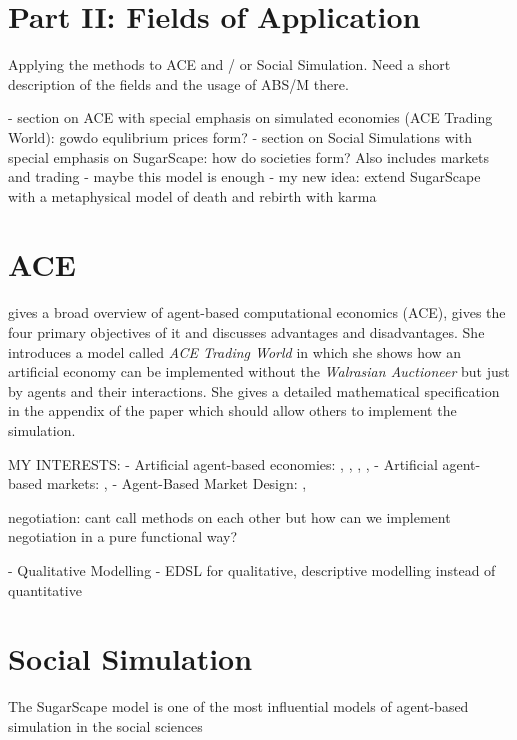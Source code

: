 \section{Part II: Fields of Application}
Applying the methods to ACE and / or Social Simulation. Need a short description of the fields and the usage of ABS/M there.

- section on ACE with special emphasis on simulated economies (ACE Trading World): gowdo equlibrium prices form?
- section on Social Simulations with special emphasis on SugarScape: how do societies form? Also includes markets and trading - maybe this model is enough
- my new idea: extend SugarScape with a metaphysical  model of death and rebirth with karma


\section{ACE}
\cite{tesfatsion_agent-based_2006} gives a broad overview of agent-based computational economics (ACE), gives the four primary objectives of it and discusses advantages and disadvantages. She introduces a model called \textit{ACE Trading World} in which she shows how an artificial economy can be implemented without the \textit{Walrasian Auctioneer} but just by agents and their interactions. She gives a detailed mathematical specification in the appendix of the paper which should allow others to implement the simulation.

MY INTERESTS:
- Artificial agent-based economies: \cite{tesfatsion_agent-based_2006}, \cite{gintis_emergence_2006}, \cite{gintis_dynamics_2007}, \cite{gaffeo_adaptive_2008}, \cite{botta_functional_2011}
- Artificial agent-based markets: \cite{mackie-mason_chapter_2006}, \cite{darley_nasdaq_2007}
- Agent-Based Market Design: \cite{marks_chapter_2006}, \cite{budish_editors_2015}

negotiation: cant call methods on each other but how can we implement negotiation in a pure functional way?

- Qualitative Modelling
	- EDSL for qualitative, descriptive modelling instead of quantitative

\section{Social Simulation}

The SugarScape model \cite{epstein_growing_1996} is one of the most influential models of agent-based simulation in the social sciences

